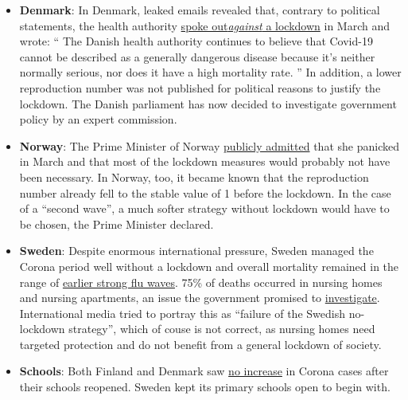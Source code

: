 \begin{itemize}
\tightlist
\item
  \textbf{Denmark}: In Denmark, leaked emails revealed that, contrary to
  political statements, the health authority
  \href{https://www.thelocal.dk/20200529/leaked-emails-show-how-denmarks-pm-steam-rollered-her-own-health-agency}{spoke
  out}\href{https://www.thelocal.dk/20200529/leaked-emails-show-how-denmarks-pm-steam-rollered-her-own-health-agency}{\emph{against}
  a lockdown} in March and wrote: `` The Danish health authority
  continues to believe that Covid-19 cannot be described as a generally
  dangerous disease because it's neither normally serious, nor does it
  have a high mortality rate. '' In addition, a lower reproduction
  number was not published for political reasons to justify the
  lockdown. The Danish parliament has now decided to investigate
  government policy by an expert commission. 
\item
  \textbf{Norway}: The Prime Minister of Norway
  \href{https://www.telegraph.co.uk/news/2020/05/30/coronavirus-norway-wonders-should-have-like-sweden/}{publicly
  admitted} that she panicked in March and that most of the lockdown
  measures would probably not have been necessary. In Norway, too, it
  became known that the reproduction number already fell to the stable
  value of 1 before the lockdown. In the case of a ``second wave'', a
  much softer strategy without lockdown would have to be chosen, the
  Prime Minister declared.
\item
  \textbf{Sweden}: Despite enormous international pressure, Sweden
  managed the Corona period well without a lockdown and overall
  mortality remained in the range of
  \href{https://www.reuters.com/article/us-health-coronavirus-sweden-toll/coronavirus-pushes-swedish-deaths-to-highest-since-1993-in-april-idUSKBN22U1S4}{earlier
  strong flu waves}. 75\% of deaths occurred in nursing homes and
  nursing apartments, an issue the government promised to
  \href{https://www.bloomberg.com/news/articles/2020-05-08/sweden-starts-criminal-probe-into-care-home-after-virus-deaths}{investigate}.
  International media tried to portray this as ``failure of the Swedish
  no-lockdown strategy'', which of couse is not correct, as nursing
  homes need targeted protection and do not benefit from a general
  lockdown of society.
\item
  \textbf{Schools}: Both Finland and Denmark saw
  \href{https://www.telegraph.co.uk/news/2020/06/04/no-rise-finlands-coronavirus-infection-rate-since-schools-reopened/}{no
  increase} in Corona cases after their schools reopened. Sweden kept
  its primary schools open to begin with.
\end{itemize}

